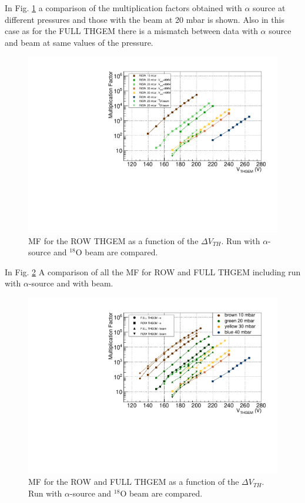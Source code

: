 \documentclass[a4paper, 11 pt]{report}
\newcommand{\Vthgem}{$\Delta V_{TH}$}
\begin{document}
  In Fig. \ref{fig:MF_ROW_beam} a comparison of the multiplication factors obtained with
  $\alpha$ source at different pressures and those with the beam at 20 mbar is shown. Also 
  in this case as for the FULL THGEM there is a mismatch between data with $\alpha$ source 
  and beam at same values of the pressure.
  
  \begin{figure}[htbp]
	\centering
	\includegraphics[width=\textwidth]{Immagini/MF_ROW_THGEM_withBeam.pdf}
	\caption{MF for the ROW THGEM as a function of the \Vthgem{}. Run with $\alpha$-source
	and $^{18}$O beam are compared. }
	\label{fig:MF_ROW_beam}
  \end{figure}
  In Fig. \ref{fig:MF_ALL_beam} A comparison of all the MF for ROW and FULL THGEM including
  run with $\alpha$-source and with beam.
  \begin{figure}[htbp]
	\centering
	\includegraphics[width=\textwidth]{Immagini/MF_ALL_THGEM_withBeam.pdf}
	\caption{MF for the ROW and FULL THGEM as a function of the \Vthgem{}. Run with $\alpha$-source
	and $^{18}$O beam are compared. }
	\label{fig:MF_ALL_beam}
  \end{figure}
\end{document}
